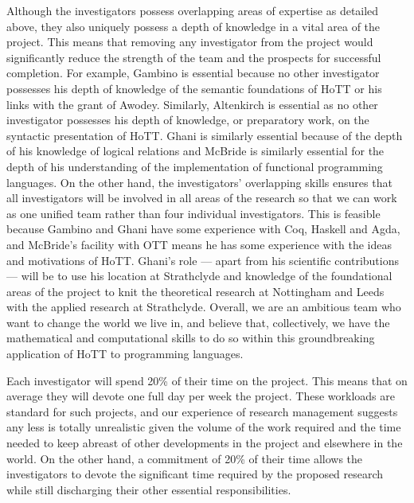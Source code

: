 \documentclass[a4paper,11pt]{article}
\begin{document}
\noindent Although the investigators possess overlapping areas of expertise as
detailed above, they also uniquely possess a depth of knowledge
in a vital area of the project. This means that removing any
investigator from the project would significantly reduce the strength
of the team and the prospects for successful completion. For example,
Gambino is essential because no other investigator possesses his depth
of knowledge of the semantic foundations of HoTT or his links with the
grant of Awodey. Similarly, Altenkirch is essential as no other
investigator possesses his depth of knowledge, or preparatory work, on
the syntactic presentation of HoTT. Ghani is similarly essential because
of the depth of his knowledge of logical relations and McBride is
similarly essential for the depth of his understanding of the
implementation of functional programming languages. On the other hand,
the investigators' overlapping skills ensures that all investigators
will be involved in all areas of the research so that we can work
as one unified team rather than four individual investigators. This is
feasible because Gambino and Ghani have some experience with
Coq, Haskell and Agda, and McBride's facility with OTT means he has some experience with
the ideas and motivations of HoTT. Ghani's role --- apart from his
scientific contributions --- will be to use his location at
Strathclyde and knowledge of the foundational areas of the
project to knit the theoretical research at Nottingham and Leeds with
the applied research at Strathclyde. Overall, we are an ambitious
team who want to change the world we live in, and believe that,
collectively, we have the mathematical and computational skills to do
so within this groundbreaking application of HoTT to programming languages.

\vspace{0.02in}

Each investigator will spend 20\% of their time on the project.  This
means that on average they will devote one full day per week the
project. These workloads are standard for such projects, and our
experience of research management suggests any less is totally
unrealistic given the volume of the work required and the time needed
to keep abreast of other developments in the project and elsewhere in
the world.  On the other hand, a commitment of 20\% of their time
allows the investigators to devote the significant time required by
the proposed research while still discharging their other essential
responsibilities.
\end{document}
